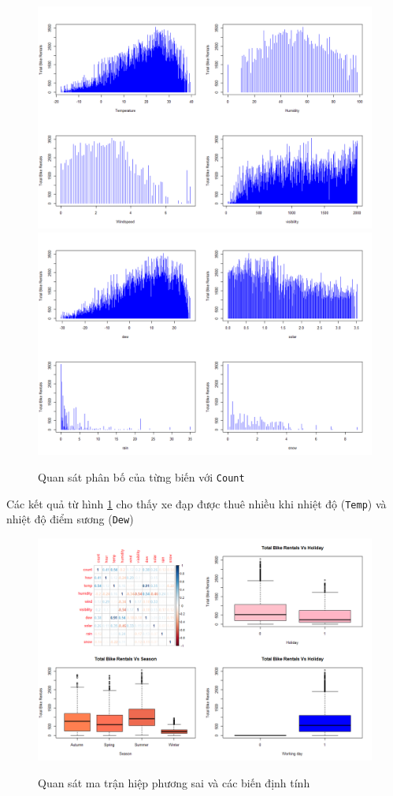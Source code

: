 \begin{figure}[H]
	\centering
	{\includegraphics[width=.8\linewidth]{../Photo Of Result/A2_plotvar1}}\\
	{\includegraphics[width=.8\linewidth]{../Photo Of Result/A2_plotvar2}}
	\caption{Quan sát phân bố của từng biến với \texttt{Count}}
	\label{A2_visual1}
\end{figure}

Các kết quả từ hình \ref{A2_visual1} cho thấy xe đạp được thuê nhiều khi nhiệt độ (\texttt{Temp}) và nhiệt độ điểm sương (\texttt{Dew}) 

\begin{figure}[H]
	\centering
	{\includegraphics[width=\linewidth]{../Photo Of Result/A2_corr}}	
	\caption{Quan sát ma trận hiệp phương sai và các biến định tính}
	\label{A2_visual2}
\end{figure}

